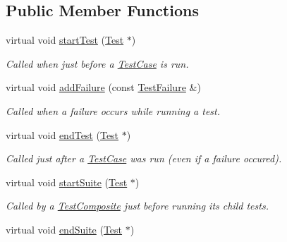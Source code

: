 \subsection*{Public Member Functions}
\begin{DoxyCompactItemize}
\item 
\hypertarget{class_test_listener_a5546d4420e7412234915113b1ea5ad77}{virtual void \hyperlink{class_test_listener_a5546d4420e7412234915113b1ea5ad77}{start\-Test} (\hyperlink{class_test}{Test} $\ast$)}\label{class_test_listener_a5546d4420e7412234915113b1ea5ad77}

\begin{DoxyCompactList}\small\item\em Called when just before a \hyperlink{class_test_case}{Test\-Case} is run. \end{DoxyCompactList}\item 
virtual void \hyperlink{class_test_listener_a103216a5814c907f7b752b969477e765}{add\-Failure} (const \hyperlink{class_test_failure}{Test\-Failure} \&)
\begin{DoxyCompactList}\small\item\em Called when a failure occurs while running a test. \end{DoxyCompactList}\item 
\hypertarget{class_test_listener_ae8ccd0f55dd9aa7eafded05ba14f9ac6}{virtual void \hyperlink{class_test_listener_ae8ccd0f55dd9aa7eafded05ba14f9ac6}{end\-Test} (\hyperlink{class_test}{Test} $\ast$)}\label{class_test_listener_ae8ccd0f55dd9aa7eafded05ba14f9ac6}

\begin{DoxyCompactList}\small\item\em Called just after a \hyperlink{class_test_case}{Test\-Case} was run (even if a failure occured). \end{DoxyCompactList}\item 
\hypertarget{class_test_listener_a2360ebfccfa39f75bdc43948d5d1d2e7}{virtual void \hyperlink{class_test_listener_a2360ebfccfa39f75bdc43948d5d1d2e7}{start\-Suite} (\hyperlink{class_test}{Test} $\ast$)}\label{class_test_listener_a2360ebfccfa39f75bdc43948d5d1d2e7}

\begin{DoxyCompactList}\small\item\em Called by a \hyperlink{class_test_composite}{Test\-Composite} just before running its child tests. \end{DoxyCompactList}\item 
\hypertarget{class_test_listener_ad49e5589681732a1faff8fca5cbe61f5}{virtual void \hyperlink{class_test_listener_ad49e5589681732a1faff8fca5cbe61f5}{end\-Suite} (\hyperlink{class_test}{Test} $\ast$)}\label{class_test_listener_ad49e5589681732a1faff8fca5cbe61f5}


\end{DoxyCompactItemize}
